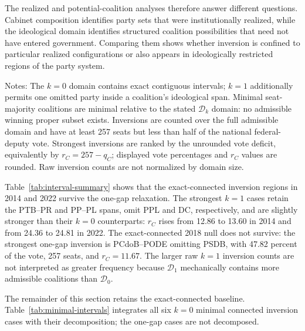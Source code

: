 \documentclass[11pt]{article}
\begin{document}
The realized and potential-coalition analyses therefore answer different
questions. Cabinet
composition identifies party sets that were institutionally realized, while the
ideological domain identifies structured coalition possibilities that need not
have entered government. Comparing them shows whether inversion is confined to
particular realized configurations or also appears in ideologically restricted
regions of the party system.

\begin{table}[htbp]
\centering
\caption{Ideological-coalition domain robustness by election}
\label{tab:interval-summary}
\small

\begin{flushleft}
\footnotesize Notes: The \(k=0\) domain contains exact contiguous intervals;
\(k=1\) additionally permits one omitted party inside a coalition's ideological
span. Minimal seat-majority coalitions are minimal relative to the stated
\(\mathcal D_k\) domain: no admissible winning proper subset exists. Inversions
are counted over the full admissible domain and have at least 257 seats but less
than half of the national federal-deputy vote. Strongest inversions are ranked
by the unrounded vote deficit, equivalently by \(r_C=257-q_C\); displayed vote
percentages and \(r_C\) values are rounded. Raw inversion counts are not
normalized by domain size.
\end{flushleft}
\end{table}

Table~\ref{tab:interval-summary} shows that the exact-connected inversion
regions in 2014 and 2022 survive the one-gap relaxation. The strongest
\(k=1\) cases retain the PTB--PR and PP--PL spans, omit PPL and DC,
respectively, and are slightly stronger than their \(k=0\) counterparts:
\(r_C\) rises from 12.86 to 13.60 in 2014 and from 24.36 to 24.81 in 2022.
The exact-connected 2018 null does not survive: the strongest one-gap inversion
is PCdoB--PODE omitting PSDB, with 47.82 percent of the vote, 257 seats, and
\(r_C=11.67\). The larger raw \(k=1\) inversion counts are not interpreted as
greater frequency because \(\mathcal D_1\) mechanically contains more
admissible coalitions than \(\mathcal D_0\).

The remainder of this section retains the exact-connected baseline.
Table~\ref{tab:minimal-intervals} integrates all six \(k=0\) minimal connected
inversion cases with their decomposition; the one-gap cases are not decomposed.
\end{document}
